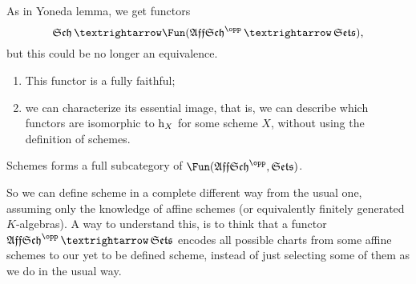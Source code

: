 \documentclass[english,course]{Notes}
\begin{document}
\begin{remark}
  As in Yoneda lemma, we get functors \[ \Schemes → \Fun(\AffineSchemes^{\opp} → \Sets)\text{,}\] but this could be no longer an equivalence.
\end{remark}

\begin{theorem}\label{theorem:affine schemes are enough}
  \mbox{}
  \begin{enumerate}
    \item This functor is a fully faithful;
    \item we can characterize its essential image, that is, we can describe which functors are isomorphic to $\operatorname{h}_X$ for some scheme $X$, without using the definition of schemes.
  \end{enumerate}
\end{theorem}

\begin{corollary}
  Schemes forms a full subcategory of $\Fun(\AffineSchemes^\opp, \Sets)$.
\end{corollary}

So we can define scheme in a complete different way from the usual one, assuming only the knowledge of affine schemes (or equivalently finitely generated $K$-algebras). A way to understand this, is to think that a functor $\AffineSchemes^\opp → \Sets$ encodes all possible charts from some affine schemes to our yet to be defined scheme, instead of just selecting some of them as we do in the usual way.
\end{document}
